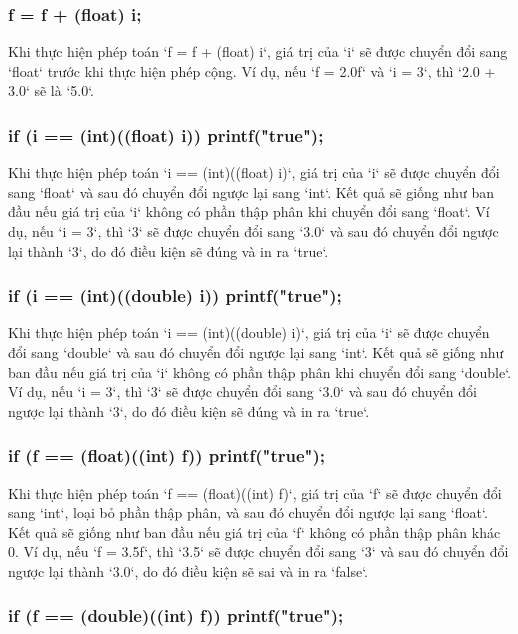 \subsubsection{f = f + (float) i;}

Khi thực hiện phép toán `f = f + (float) i`, giá trị của `i` sẽ được chuyển đổi sang `float` trước khi thực hiện phép cộng. Ví dụ, nếu `f = 2.0f` và `i = 3`, thì `2.0 + 3.0` sẽ là `5.0`.

\subsubsection{if (i == (int)((float) i)) printf("true");}

Khi thực hiện phép toán `i == (int)((float) i)`, giá trị của `i` sẽ được chuyển đổi sang `float` và sau đó chuyển đổi ngược lại sang `int`. Kết quả sẽ giống như ban đầu nếu giá trị của `i` không có phần thập phân khi chuyển đổi sang `float`. Ví dụ, nếu `i = 3`, thì `3` sẽ được chuyển đổi sang `3.0` và sau đó chuyển đổi ngược lại thành `3`, do đó điều kiện sẽ đúng và in ra `true`.

\subsubsection{if (i == (int)((double) i)) printf("true");}

Khi thực hiện phép toán `i == (int)((double) i)`, giá trị của `i` sẽ được chuyển đổi sang `double` và sau đó chuyển đổi ngược lại sang `int`. Kết quả sẽ giống như ban đầu nếu giá trị của `i` không có phần thập phân khi chuyển đổi sang `double`. Ví dụ, nếu `i = 3`, thì `3` sẽ được chuyển đổi sang `3.0` và sau đó chuyển đổi ngược lại thành `3`, do đó điều kiện sẽ đúng và in ra `true`.

\subsubsection{if (f == (float)((int) f)) printf("true");}

Khi thực hiện phép toán `f == (float)((int) f)`, giá trị của `f` sẽ được chuyển đổi sang `int`, loại bỏ phần thập phân, và sau đó chuyển đổi ngược lại sang `float`. Kết quả sẽ giống như ban đầu nếu giá trị của `f` không có phần thập phân khác 0. Ví dụ, nếu `f = 3.5f`, thì `3.5` sẽ được chuyển đổi sang `3` và sau đó chuyển đổi ngược lại thành `3.0`, do đó điều kiện sẽ sai và in ra `false`.

\subsubsection{if (f == (double)((int) f)) printf("true");}

